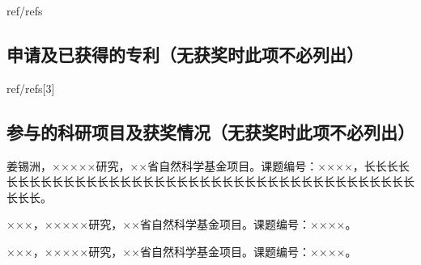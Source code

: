 \begin{resume}
  \begin{localref}{ref/refs}
    \nocite{zhangkun1994}
    \nocite{bixon1996dynamics}
  \end{localref}


  \subsection{申请及已获得的专利（无获奖时此项不必列出）}


  \begin{localref}{ref/refs}[3]
    \nocite{chenxu2020yejing}
    \nocite{jiangxizhou1980}
    \nocite{kamiya2018nature}
  \end{localref}

  \subsection{参与的科研项目及获奖情况（无获奖时此项不必列出）}
  \begin{achievements}[start=6]
    \item 姜锡洲，×××××研究，××省自然科学基金项目。课题编号：××××，长长长长长长长长长长长长长长长长长长长长长长长长长长长长长长长长长长长长长长长长长长长。
    \item ×××，×××××研究，××省自然科学基金项目。课题编号：××××。
    \item ×××，×××××研究，××省自然科学基金项目。课题编号：××××。
  \end{achievements}

\end{resume}

